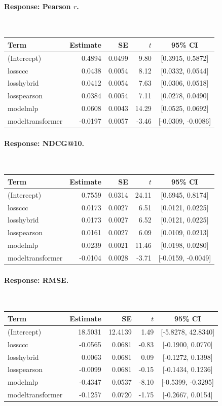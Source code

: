\paragraph{Response: Pearson $r$.}\mbox{}\\[2pt]
\begin{tabular}{lrrrc}
\toprule
Term & Estimate & SE & $t$ & 95\% CI \\
\midrule
(Intercept) & 0.4894 & 0.0499 & 9.80 & [0.3915, 0.5872] \\
lossccc & 0.0438 & 0.0054 & 8.12 & [0.0332, 0.0544] \\
losshybrid & 0.0412 & 0.0054 & 7.63 & [0.0306, 0.0518] \\
losspearson & 0.0384 & 0.0054 & 7.11 & [0.0278, 0.0490] \\
modelmlp & 0.0608 & 0.0043 & 14.29 & [0.0525, 0.0692] \\
modeltransformer & -0.0197 & 0.0057 & -3.46 & [-0.0309, -0.0086] \\
\bottomrule
\end{tabular}


\paragraph{Response: NDCG@10.}\mbox{}\\[2pt]
\begin{tabular}{lrrrc}
\toprule
Term & Estimate & SE & $t$ & 95\% CI \\
\midrule
(Intercept) & 0.7559 & 0.0314 & 24.11 & [0.6945, 0.8174] \\
lossccc & 0.0173 & 0.0027 & 6.51 & [0.0121, 0.0225] \\
losshybrid & 0.0173 & 0.0027 & 6.52 & [0.0121, 0.0225] \\
losspearson & 0.0161 & 0.0027 & 6.09 & [0.0109, 0.0213] \\
modelmlp & 0.0239 & 0.0021 & 11.46 & [0.0198, 0.0280] \\
modeltransformer & -0.0104 & 0.0028 & -3.71 & [-0.0159, -0.0049] \\
\bottomrule
\end{tabular}


\paragraph{Response: RMSE.}\mbox{}\\[2pt]
\begin{tabular}{lrrrc}
\toprule
Term & Estimate & SE & $t$ & 95\% CI \\
\midrule
(Intercept) & 18.5031 & 12.4139 & 1.49 & [-5.8278, 42.8340] \\
lossccc & -0.0565 & 0.0681 & -0.83 & [-0.1900, 0.0770] \\
losshybrid & 0.0063 & 0.0681 & 0.09 & [-0.1272, 0.1398] \\
losspearson & -0.0099 & 0.0681 & -0.15 & [-0.1434, 0.1236] \\
modelmlp & -0.4347 & 0.0537 & -8.10 & [-0.5399, -0.3295] \\
modeltransformer & -0.1257 & 0.0720 & -1.75 & [-0.2667, 0.0154] \\
\bottomrule
\end{tabular}
